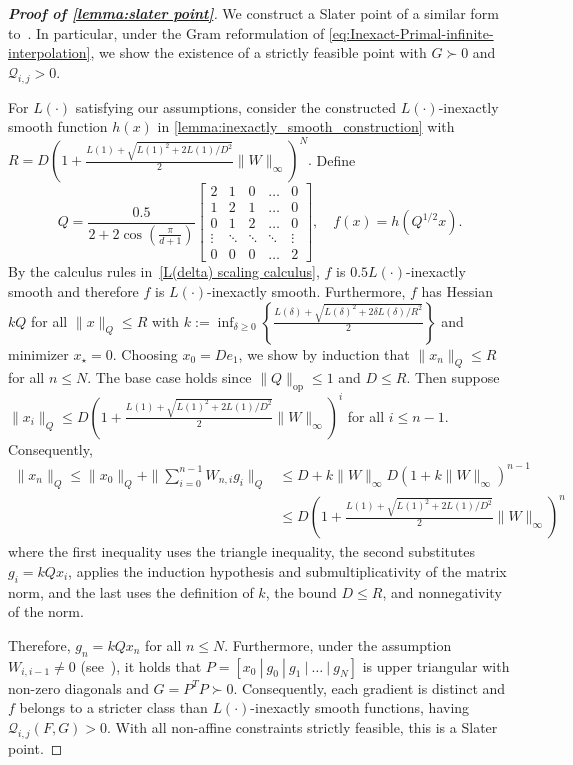 \documentclass[11pt, hidelinks]{article}
\numberwithin{equation}{section}
\theoremstyle{thmstyletwo}%
\numberwithin{equation}{section}
\begin{document}
\begin{proof}[\bf Proof of \cref{lemma:slater point}]
     We construct a Slater point of a similar form to~\cite[Theorem 6]{taylor2017smooth}. In particular, under the Gram reformulation of \eqref{eq:Inexact-Primal-infinite-interpolation}, we show the existence of a strictly feasible point with $G \succ 0$ and $\mathcal{Q}_{i,j} > 0$. 
    
    For $L(\cdot)$ satisfying our assumptions, consider the constructed $L(\cdot)$-inexactly smooth function $h(x)$ in \cref{lemma:inexactly_smooth_construction} with  $R = D(1+\frac{L(1)+\sqrt{L(1)^2+2L(1)/D^2}}{2}\|W\|_\infty)^N.$ Define $$Q = \frac{0.5}{2+2\cos\left(\frac{\pi}{d+1}\right)}\begin{bmatrix}
        2 & 1 & 0 & \dots & 0 \\
        1 & 2 & 1 & \dots & 0 \\
        0 & 1 & 2 & \dots & 0\\
        \vdots & \ddots & \ddots & \ddots & \vdots \\
        0 & 0 & 0 & \dots & 2
    \end{bmatrix}, \quad f(x) = h(Q^{1/2}x).$$
    By the calculus rules in~\cref{L(delta) scaling calculus}, $f$ is $0.5 L(\cdot)$-inexactly smooth and therefore $f$ is $L(\cdot)$-inexactly smooth. Furthermore, $f$ has Hessian $kQ$ for all $\|x\|_{Q} \leq R$ with $k := \inf_{\delta \geq 0} \left\{\frac{L\left(\delta\right)+\sqrt{L\left(\delta\right)^{2}+2\delta L\left(\delta\right)/R^2}}{2}\right\}$ and minimizer $x_\star = 0$. Choosing $x_0 = D e_1$, we show by induction that $\|x_n\|_Q \leq R$ for all $n \leq N$. The base case holds since $\|Q\|_{\mathrm{op}} \leq 1$ and $D \leq R$. Then suppose $\|x_i\|_Q \leq D(1+\frac{L(1)+\sqrt{L(1)^2+2L(1)/D^2}}{2}\|W\|_\infty)^i$ for all $i \leq n-1$. Consequently, \begin{align*}\|x_n\|_Q \leq \|x_0\|_Q + \|\sum_{i=0}^{n-1} W_{n, i}g_i\|_Q
    &\leq D + k\|W\|_\infty D(1+k\|W\|_\infty)^{n-1}  \\
    &\leq D(1+\frac{L(1)+\sqrt{L(1)^2+2L(1)/D^2}}{2}\|W\|_\infty)^n\end{align*}
    where the first inequality uses the triangle inequality, the second substitutes $g_i = kQx_i$, applies the induction hypothesis and submultiplicativity of the matrix norm, and the last uses the definition of $k$, the bound $D \leq R$, and nonnegativity of the norm.
    
    Therefore, $g_n = kQx_n$ for all $n \leq N$. Furthermore, under the assumption $W_{i,i-1} \ne 0$ (see~\cite[Theorem 6]{taylor2017smooth}), it holds that $P = [x_0 \ | \ g_0 \ |\  g_1 \ |\  \dots\ | \ g_N]$ is upper triangular with non-zero diagonals and $G=P^TP \succ 0$. Consequently, each gradient is distinct and $f$ belongs to a stricter class than $L(\cdot)$-inexactly smooth functions, having $\mathcal{Q}_{i,j}(F,G)>0$. With all non-affine constraints strictly feasible, this is a Slater point. 
\end{proof}
\end{document}
